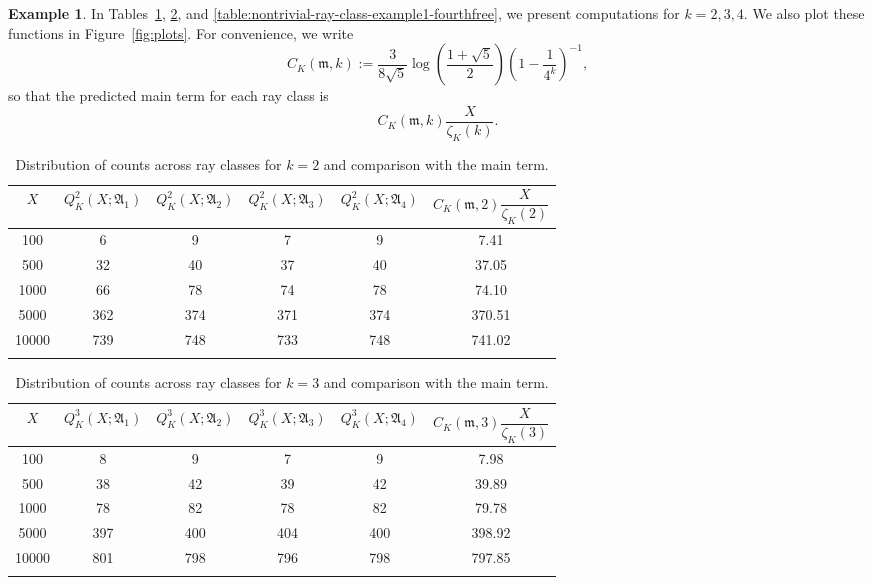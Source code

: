 \documentclass[11pt, reqno]{amsart}
\numberwithin{equation}{section}
\theoremstyle{definition}
\newtheorem{example}[theorem]{Example}
\begin{document}
\begin{example}
In Tables~\ref{table:nontrivial-ray-class-example1-squarefree},
\ref{table:nontrivial-ray-class-example1-cubefree}, and
\ref{table:nontrivial-ray-class-example1-fourthfree}, we present computations for
$k=2,3,4$. We also plot these functions in Figure~\ref{fig:plots}. For convenience, we write
\[
C_K(\mathfrak{m},k)
:=
\frac{3}{8\sqrt{5}}
\log\left(\frac{1+\sqrt{5}}{2}\right)
\left(1-\frac{1}{4^k}\right)^{-1},
\]
so that the predicted main term for each ray class is
\[
C_K(\mathfrak{m},k)\frac{X}{\zeta_K(k)}.
\]

\begin{table}[h!]
\centering
\renewcommand{\arraystretch}{1.4}
\begin{tabular}{c c c c c c}
\toprule
$X$ & $Q_K^{2}(X; \mathfrak{A}_1)$ & $Q_K^{2}(X; \mathfrak{A}_2)$ & $Q_K^{2}(X; \mathfrak{A}_3)$ & $Q_K^{2}(X; \mathfrak{A}_4)$ & $C_K(\mathfrak{m}, 2) \dfrac{X}{\zeta_K(2)}$ \\
\midrule
100   & 6   & 9   & 7   & 9   & 7.41 \\
500   & 32  & 40  & 37  & 40  & 37.05 \\
1000  & 66  & 78  & 74  & 78  & 74.10 \\
5000  & 362 & 374 & 371 & 374 & 370.51 \\
10000 & 739 & 748 & 733 & 748 & 741.02 \\
\bottomrule\\
\end{tabular}
\caption{Distribution of counts across ray classes for $k=2$ and comparison with the main term.}
\label{table:nontrivial-ray-class-example1-squarefree}
\end{table}

\begin{table}[h!]
\centering
\renewcommand{\arraystretch}{1.4}
\begin{tabular}{c c c c c c}
\toprule
$X$ & $Q_K^{3}(X; \mathfrak{A}_1)$ & $Q_K^{3}(X; \mathfrak{A}_2)$ & $Q_K^{3}(X; \mathfrak{A}_3)$ & $Q_K^{3}(X; \mathfrak{A}_4)$ & $C_K(\mathfrak{m}, 3) \dfrac{X}{\zeta_K(3)}$ \\
\midrule
100   & 8   & 9   & 7   & 9   & 7.98 \\
500   & 38  & 42  & 39  & 42  & 39.89 \\
1000  & 78  & 82  & 78  & 82  & 79.78 \\
5000  & 397 & 400 & 404 & 400 & 398.92 \\
10000 & 801 & 798 & 796 & 798 & 797.85 \\
\bottomrule\\
\end{tabular}
\caption{Distribution of counts across ray classes for $k=3$ and comparison with the main term.}
\label{table:nontrivial-ray-class-example1-cubefree}
\end{table}



\end{example}
\end{document}

